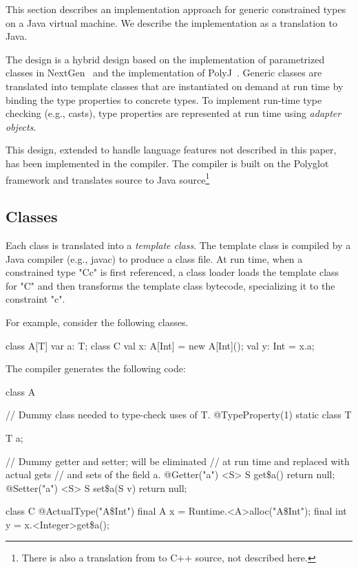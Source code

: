 This section describes an implementation approach for
generic constrained types on a Java virtual machine.
We describe the implementation as a translation to Java.

The design is a hybrid design based on the implementation of
parametrized classes in NextGen~\cite{nextgen,allen03,allen04} and the
implementation of PolyJ~\cite{java-popl97}.  Generic classes are translated
into template classes that are instantiated on demand at run time by
binding the type properties to concrete types.  To implement run-time
type checking (e.g., casts), type properties are represented at run
time using \emph{adapter objects}.

This design, extended to handle language features
not described in this paper, has been implemented in the \Xten{}
compiler.  The \Xten{} compiler is built on the Polyglot framework
and translates \Xten{} source to Java source\footnote{There is also
a translation from \Xten{} to C++ source, not described here.}

\subsection{Classes}
Each class is translated into a \emph{template class}.
The template class is compiled by a Java compiler (e.g., javac)
to produce a class file.
At run time, when a constrained type \xcd"C{c}" is first referenced, a
class loader loads the template class for \xcd"C" and then transforms the
template class bytecode, specializing it to the constraint
\xcd"c".

For example, consider the following classes.
{\footnotesize
\begin{xten}
class A[T] {
    var a: T;
}
class C {
    val x: A[Int] = new A[Int]();
    val y: Int = x.a;
}
\end{xten}}

The compiler generates the following code:
{\footnotesize
\begin{xten}
class A {
    // Dummy class needed to type-check uses of T.
    @TypeProperty(1) static class T { }

    T a;

    // Dummy getter and setter; will be eliminated
    // at run time and replaced with actual gets
    // and sets of the field a.
    @Getter("a") <S> S get\$a() { return null; }
    @Setter("a") <S> S set\$a(S v) { return null; }
}

class C {
    @ActualType("A\$Int")
    final A x = Runtime.<A>alloc("A\$Int");
    final int y = x.<Integer>get\$a();
}
\end{xten}}

